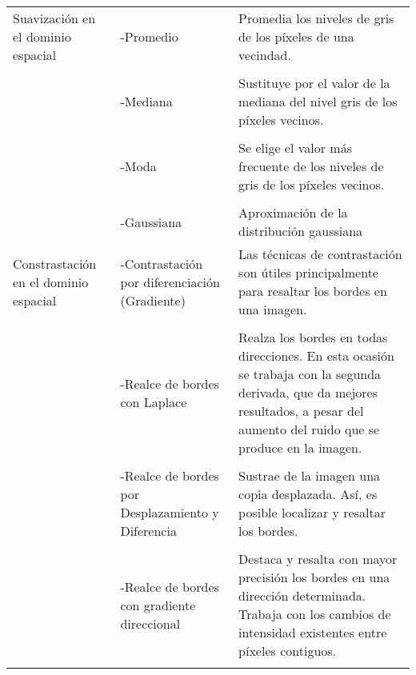 \documentclass[letterpaper]{article}
\begin{document}
\begin{table}[H]

	\centering
    
	\begin{tabular}[13cm]{ 
    >{\centering\arraybackslash}m{3cm} 
    >{}m{5cm} 
    >{}m{5cm}}
        
        \midrule
        
         Suavización en el dominio espacial
       
         & -Promedio & Promedia los niveles de gris de los píxeles de una vecindad. \\ \\
         
         & -Mediana & Sustituye por el valor de la mediana del nivel gris de los píxeles vecinos. \\ \\
         
         & -Moda & Se elige el valor más frecuente de los niveles de gris de los píxeles vecinos.  \\ \\
         
         & -Gaussiana & Aproximación de la distribución gaussiana \\
         

         \midrule
        
        Constrastación en el dominio espacial
        
         & -Contrastación por diferenciación (Gradiente) &  Las técnicas de contrastación son útiles principalmente para resaltar los bordes
en una imagen.\\ \\
        
         & -Realce de bordes con Laplace & Realza los bordes en todas direcciones. En esta ocasión se trabaja con la segunda derivada, que da mejores resultados, a pesar del aumento del ruido que se produce en la imagen. \\ \\

		 & -Realce de bordes por Desplazamiento y Diferencia & Sustrae de la imagen una copia desplazada. Así, es posible localizar y resaltar los bordes.\\ \\
        
         & -Realce de bordes con gradiente direccional & Destaca y resalta con mayor precisión los bordes en una dirección determinada. Trabaja con los cambios de intensidad existentes entre píxeles contiguos. \\ \\
        

\end{tabular}
\end{table}
\end{document}
